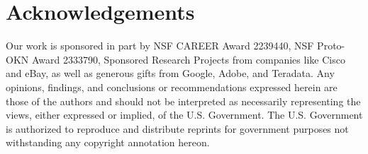 \documentclass{article}
\theoremstyle{plain}
\theoremstyle{definition}
\theoremstyle{remark}
\begin{document}



\section*{Acknowledgements}
Our work is sponsored in part by NSF CAREER Award 2239440, NSF Proto-OKN Award 2333790, Sponsored Research Projects from companies like Cisco and eBay, as well as generous gifts from Google, Adobe, and Teradata. Any opinions, findings, and conclusions or recommendations expressed herein are those of the authors and should not be interpreted as necessarily representing the views, either expressed or implied, of the U.S. Government. The U.S. Government is authorized to reproduce and distribute reprints for government purposes not withstanding any copyright annotation hereon.


\end{document}
